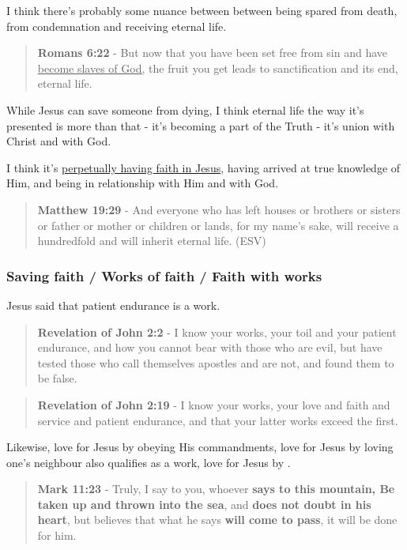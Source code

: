 \documentclass[11pt]{article}
\begin{document}
I think there's probably some nuance between between being spared from death, from condemnation and receiving eternal life.

\begin{quote}
\textbf{Romans 6:22} - But now that you have been set free from sin and have \uline{become slaves of God,} the fruit you get leads to sanctification and its end, eternal life.
\end{quote}

While Jesus can save someone from dying, I think eternal life the way it's presented is more than that - it's becoming a part of the Truth - it's union with Christ and with God.

I think it's \uline{perpetually having faith in Jesus}, having arrived at true knowledge of Him, and being in relationship with Him and with God.

\begin{quote}
\textbf{Matthew 19:29} - And everyone who has left houses or brothers or sisters or father or mother or children or lands, for my name's sake, will receive a hundredfold and will inherit eternal life. (ESV)
\end{quote}

\subsubsection{Saving faith / Works of faith / Faith with works}
\label{sec:org37c521b}
Jesus said that patient endurance is a work.

\begin{quote}
\textbf{Revelation of John 2:2} - I know your works, your toil and your patient endurance, and how you cannot bear with those who are evil, but have tested those who call themselves apostles and are not, and found them to be false.
\end{quote}

\begin{quote}
\textbf{Revelation of John 2:19} - I know your works, your love and faith and service and patient endurance, and that your latter works exceed the first.
\end{quote}

Likewise, love for Jesus by obeying His commandments, love for Jesus by loving one's neighbour also qualifies as a work, love for Jesus by .

\begin{quote}
\textbf{Mark 11:23} - Truly, I say to you, whoever \textbf{says to this mountain, Be taken up and thrown into the sea}, and \textbf{does not doubt in his heart}, but believes that what he says \textbf{will come to pass}, it will be done for him.
\end{quote}
\end{document}
